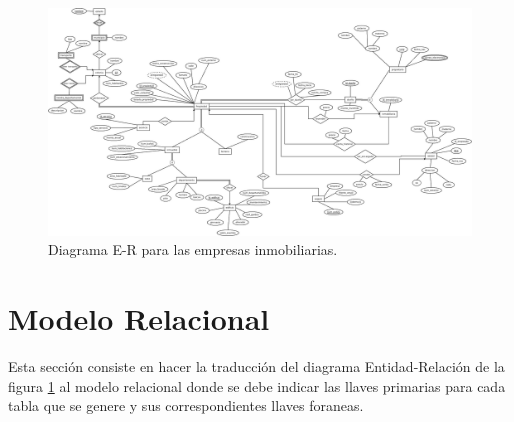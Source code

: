 \documentclass[10pt]{article}
\begin{document}
	\begin{center}
		\begin{figure}[H]
			\centering
			\includegraphics[width=1 \textwidth]{modeloER.jpeg}
			\caption{Diagrama E-R para las empresas inmobiliarias.}
			\label{ER}
		\end{figure}
	\end{center}
    \section{Modelo Relacional}
    
    Esta sección consiste en hacer la traducción del diagrama Entidad-Relación de la figura \ref{ER} al modelo relacional donde se debe indicar las llaves primarias para cada tabla que se genere y sus correspondientes llaves foraneas.
    
\end{document}
